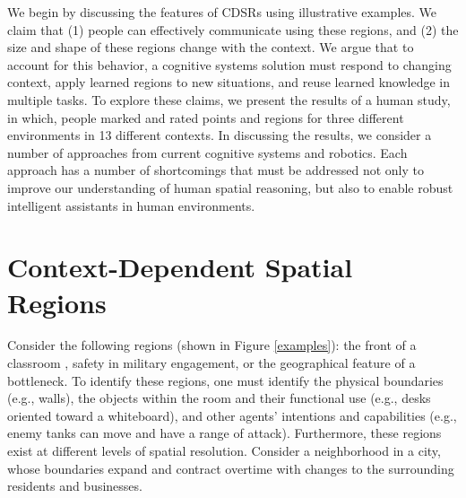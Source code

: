 \documentclass[11pt,letterpaper]{article}
\begin{document}
We begin by discussing the features of CDSRs using illustrative examples.  We claim that (1) people can effectively communicate using these regions, and (2) the size and shape of these regions change with the context.  We argue that to account for this behavior, a cognitive systems solution must respond to changing context, apply learned regions to new situations, and reuse learned knowledge in multiple tasks.  To explore these claims, we present the results of a human study, in which, people marked and rated points and regions for three different environments in 13 different contexts.  In discussing the results, we consider a number of approaches from current cognitive systems and robotics.  Each approach has a number of shortcomings that must be addressed not only to improve our understanding of human spatial reasoning, but also to enable robust intelligent assistants in human environments.

\section{Context-Dependent Spatial Regions}
Consider the following regions (shown in Figure \ref{examples}): the front of a classroom , safety in military engagement, or the geographical feature of a bottleneck.  To identify these regions, one must identify the physical boundaries (e.g., walls), the objects within the room and their functional use (e.g., desks oriented toward a whiteboard), and other agents' intentions and capabilities (e.g., enemy tanks can move and have a range of attack).  Furthermore, these regions exist at different levels of spatial resolution.  Consider a neighborhood in a city, whose boundaries expand and contract overtime with changes to the surrounding residents and businesses.
\end{document}
